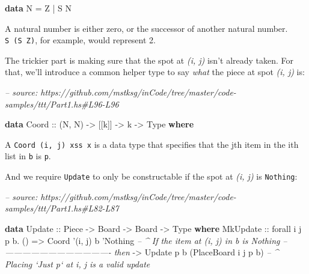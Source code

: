 \documentclass[]{article}
\newenvironment{Shaded}{}{}
\newcommand{\CommentTok}[1]{\textcolor[rgb]{0.38,0.63,0.69}{\textit{#1}}}
\newcommand{\DataTypeTok}[1]{\textcolor[rgb]{0.56,0.13,0.00}{#1}}
\newcommand{\FunctionTok}[1]{\textcolor[rgb]{0.02,0.16,0.49}{#1}}
\newcommand{\KeywordTok}[1]{\textcolor[rgb]{0.00,0.44,0.13}{\textbf{#1}}}
\newcommand{\NormalTok}[1]{#1}
\newcommand{\OtherTok}[1]{\textcolor[rgb]{0.00,0.44,0.13}{#1}}
\begin{document}
\begin{Shaded}
\begin{Highlighting}[]
\KeywordTok{data} \DataTypeTok{N} \FunctionTok{=} \DataTypeTok{Z} \FunctionTok{|} \DataTypeTok{S} \DataTypeTok{N}
\end{Highlighting}
\end{Shaded}

A natural number is either zero, or the successor of another natural number.
\texttt{S\ (S\ Z)}, for example, would represent 2.

The trickier part is making sure that the spot at \emph{(i, j)} isn't already
taken. For that, we'll introduce a common helper type to say \emph{what} the
piece at spot \emph{(i, j)} is:

\begin{Shaded}
\begin{Highlighting}[]
\CommentTok{-- source: https://github.com/mstksg/inCode/tree/master/code-samples/ttt/Part1.hs#L96-L96}

\KeywordTok{data} \DataTypeTok{Coord}\OtherTok{ ::}\NormalTok{ (}\DataTypeTok{N}\NormalTok{, }\DataTypeTok{N}\NormalTok{) }\OtherTok{->}\NormalTok{ [[k]] }\OtherTok{->}\NormalTok{ k }\OtherTok{->} \DataTypeTok{Type} \KeywordTok{where}
\end{Highlighting}
\end{Shaded}

A \texttt{Coord\ \textquotesingle{}(i,\ j)\ xss\ x} is a data type that
specifies that the jth item in the ith list in \texttt{b} is \texttt{p}.

And we require \texttt{Update} to only be constructable if the spot at \emph{(i,
j)} is \texttt{Nothing}:

\begin{Shaded}
\begin{Highlighting}[]
\CommentTok{-- source: https://github.com/mstksg/inCode/tree/master/code-samples/ttt/Part1.hs#L82-L87}

\KeywordTok{data} \DataTypeTok{Update}\OtherTok{ ::} \DataTypeTok{Piece} \OtherTok{->} \DataTypeTok{Board} \OtherTok{->} \DataTypeTok{Board} \OtherTok{->} \DataTypeTok{Type} \KeywordTok{where}
    \DataTypeTok{MkUpdate}
\OtherTok{        ::}\NormalTok{ forall i j p b}\FunctionTok{.}\NormalTok{ ()}
        \OtherTok{=>} \DataTypeTok{Coord}\NormalTok{ '(i, j) b '}\DataTypeTok{Nothing}         \CommentTok{-- ^ If the item at (i, j) in b is Nothing}
        \CommentTok{-- ------------------------------------- then}
        \OtherTok{->} \DataTypeTok{Update}\NormalTok{ p b (}\DataTypeTok{PlaceBoard}\NormalTok{ i j p b)  }\CommentTok{-- ^ Placing `Just p` at i, j is a valid update}
\end{Highlighting}
\end{Shaded}
\end{document}
